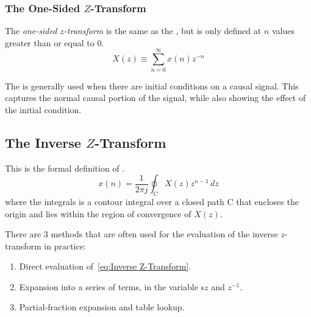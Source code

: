 \subsubsection{The One-Sided \texorpdfstring{$Z$-Transform}{Z-Transform}}\label{subsubsec:One-Sided Z-Transform}
\begin{definition}\label{def:One-Sided Z-Transform}
  The \emph{one-sided $z$-transform} is the same as the , but is only defined at $n$ values greater than or equal to 0.
  \begin{equation}\label{eq:One-Sided Z-Transform}
    X(z) \equiv \sum_{n=0}^{\infty} x(n)z^{-n}
  \end{equation}
\end{definition}

The  is generally used when there are initial conditions on a causal signal.
This captures the normal causal portion of the signal, while also showing the effect of the initial condition.

\subsection{The Inverse \texorpdfstring{$Z$-Transform}{Z-Transform}}\label{subsec:Inverse Z-Transform}
This is the formal definition of .
\begin{equation}\label{eq:Inverse Z-Transform}
  x(n) = \frac{1}{2 \pi j} \oint_{C} X(z) z^{n-1} \, dz
\end{equation}
where the integrals is a contour integral over a closed path C that encloses the origin and lies within the region of convergence of $X(z)$.

There are 3 methods that are often used for the evaluation of the inverse $z$-transform in practice:
\begin{enumerate}[noitemsep]
\item Direct evaluation of~\eqref{eq:Inverse Z-Transform}.
\item Expansion into a series of terms, in the variable s$z$ and $z^{-1}$.
\item Partial-fraction expansion and table lookup.
\end{enumerate}

